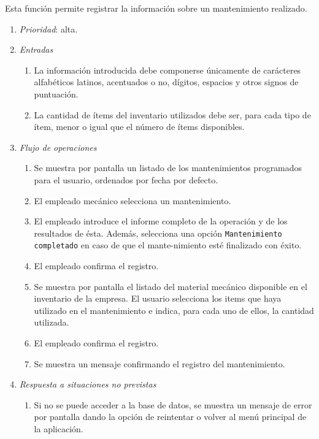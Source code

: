 
	Esta función permite registrar la información sobre un mantenimiento realizado.

	\begin{enumerate}
		\item \textit{Prioridad}: alta.
		\item \textit{Entradas}
		\begin{enumerate}
			\item La información introducida debe componerse únicamente de carácteres alfabéticos latinos, acentuados o no, dígitos, espacios y otros signos de puntuación.
			\item La cantidad de ítems del inventario utilizados debe ser, para cada tipo de ítem, menor o igual que el número de ítems disponibles.
		\end{enumerate}
		\item \textit{Flujo de operaciones}
		\begin{enumerate}
			\item Se muestra por pantalla un listado de los mantenimientos programados para el usuario, ordenados por fecha por defecto.
			\item El empleado mecánico selecciona un mantenimiento.
			\item El empleado introduce el informe completo de la operación y de los resultados de ésta. Además, selecciona una opción \verb|Mantenimiento completado| en caso de que el mante-\break{}nimiento esté finalizado con éxito. 
			\item El empleado confirma el registro.
			\item Se muestra por pantalla el listado del material mecánico disponible en el inventario de la empresa. El usuario selecciona los items que haya utilizado en el mantenimiento e indica, para cada uno de ellos, la cantidad utilizada.
			\item El empleado confirma el registro.
			\item Se muestra un mensaje confirmando el registro del mantenimiento.
		\end{enumerate}
		\item \textit{Respuesta a situaciones no previstas}
		\begin{enumerate}
			\item Si no se puede acceder a la base de datos, se muestra un mensaje de error por pantalla dando la opción de reintentar o volver al menú principal de la aplicación.
		\end{enumerate}
	\end{enumerate}
